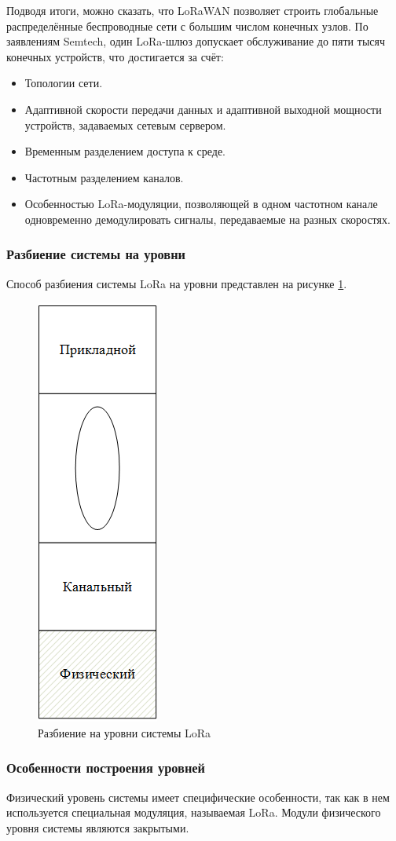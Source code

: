 Подводя итоги, можно сказать, что LoRaWAN позволяет строить глобальные распределённые беспроводные сети с большим числом конечных узлов. По заявлениям Semtech, один LoRa-шлюз допускает обслуживание до пяти тысяч конечных устройств, что достигается за счёт:
\begin{itemize}	
\item Топологии сети.
\item Адаптивной скорости передачи данных и адаптивной выходной мощности устройств, задаваемых сетевым сервером.
\item Временным разделением доступа к среде.
\item Частотным разделением каналов.
\item Особенностью LoRa-модуляции, позволяющей в одном частотном канале одновременно демодулировать сигналы, передаваемые на разных скоростях.
\end{itemize}


\subsubsection{Разбиение системы на уровни}
Способ разбиения системы LoRa на уровни представлен на рисунке
\ref{fig:system_levels_LoRa}.
\begin{figure}[h]
	\centering\includegraphics[width=0.2\linewidth]{img/system_levels_LoRa}
	\caption{Разбиение на уровни системы LoRa}
	\label{fig:system_levels_LoRa}
\end{figure}
\subsubsection{Особенности построения уровней}
Физический уровень системы имеет специфические особенности, так как в нем используется специальная модуляция, называемая LoRa. Модули физического уровня системы являются закрытыми.

